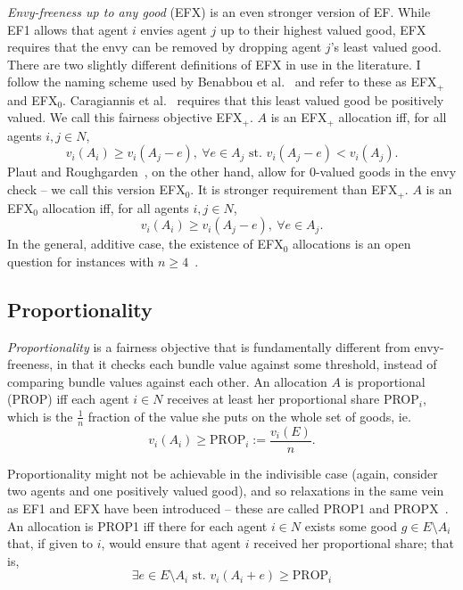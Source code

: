 \textit{Envy-freeness up to any good} (EFX) is an even stronger version of EF. While EF1 allows that agent $i$ envies agent $j$ up to their highest valued good, EFX requires that the envy can be removed by dropping agent $j$'s least valued good. There are two slightly different definitions of EFX in use in the literature. I follow the naming scheme used by Benabbou et al.~\cite{benabbou-2021} and refer to these as EFX$_+$ and EFX$_0$. Caragiannis et al.~\cite{caragiannis-Unreasonable} requires that this least valued good be positively valued. We call this fairness objective EFX$_+$. $A$ is an EFX$_+$ allocation iff, for all agents $i,j \in N$,
\begin{equation} \tag{EFX$_+$}
  v_i(A_i) \geq v_i(A_j - e),\ \forall e \in A_j \text{ st. } v_i(A_j-e) < v_i(A_j).
\end{equation}
Plaut and Roughgarden~\cite{plaut2017envyfreeness}, on the other hand, allow for 0-valued goods in the envy check -- we call this version EFX$_0$. It is stronger requirement than EFX$_+$. $A$ is an EFX$_0$ allocation iff, for all agents $i,j \in N$,
\begin{equation} \tag{EFX$_0$}
  v_i(A_i) \geq v_i(A_j - e),\ \forall e \in A_j.
\end{equation}
In the general, additive case, the existence of EFX$_0$ allocations is an open question for instances with $n\geq4$~\cite{amanatidis2022fair}.

\subsection{Proportionality}
\textit{Proportionality} is a fairness objective that is fundamentally different from envy-freeness, in that it checks each bundle value against some threshold, instead of comparing bundle values against each other. An allocation $A$ is proportional (PROP) iff each agent $i\in N$ receives at least her proportional share PROP$_i$, which is the $\frac{1}{n}$ fraction of the value she puts on the whole set of goods, ie.
\begin{equation}\tag{PROP}
  v_i(A_i)\geq \text{PROP}_i := \frac{v_i(E)}{n}.
\end{equation}

Proportionality might not be achievable in the indivisible case (again, consider two agents and one positively valued good), and so relaxations in the same vein as EF1 and EFX have been introduced -- these are called PROP1 and PROPX~\cite{amanatidis2022fair}. An allocation is PROP1 iff there for each agent $i \in N$ exists some good $g\in E\setminus A_i$ that, if given to $i$, would ensure that agent $i$ received her proportional share; that is, 
\begin{equation}\tag{PROP1}
  \exists e\in E\setminus A_i\text{ st. }v_i(A_i+e)\geq\text{PROP}_i
\end{equation}

